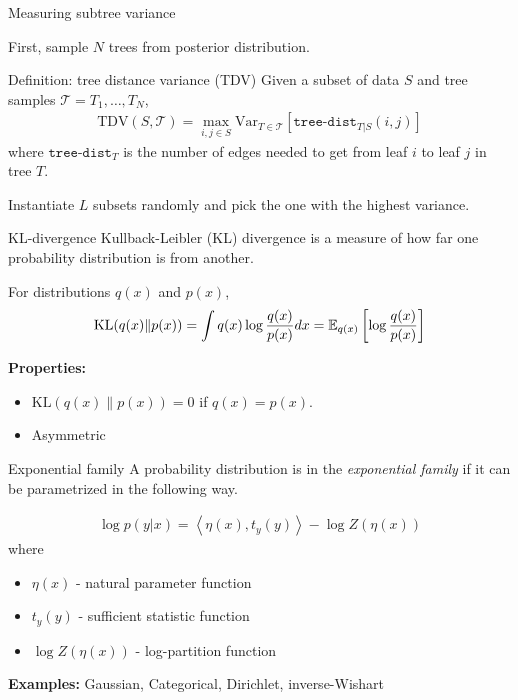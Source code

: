 \documentclass[10pt, compress]{beamer}
\begin{document}
\begin{frame}{Measuring subtree variance}

    First, sample $N$ trees from posterior distribution.

  \pause

  \begin{block}{Definition: tree distance variance (TDV)}
    Given a subset of data $S$ and tree samples $\mathcal{T} = T_1, \ldots, T_N$,
    \begin{align}
      \mathrm{TDV}(S, \mathcal{T}) = \max_{i, j \in S}  \mathrm{Var}_{T \in \mathcal{T}}\left[\texttt{tree-dist}_{T|S}(i, j)\right]
    \end{align}
  where $\texttt{tree-dist}_T$ is the number of edges needed to get from leaf $i$ to leaf $j$
  in tree $T$.
  \end{block}

  \pause

Instantiate $L$ subsets randomly and pick the one with the highest variance.

\end{frame}

\begin{frame}{KL-divergence}
  Kullback-Leibler (KL) divergence
  is a measure of how far one probability distribution
  is from another.

  \pause
  For distributions $q(x)$ and $p(x)$,
  \begin{align*}
    \textrm{KL}(q(x)\|p(x)) = \int q(x)\log \frac{q(x)}{p(x)}dx = \mathbb{E}_{q(x)}\left[\log\frac{q(x)}{p(x)}\right]
  \end{align*}

  \pause
  \textbf{Properties:}
  \begin{itemize}
    \item $\textrm{KL}(q(x)\|p(x)) = 0$ if $q(x) = p(x)$.
    \item Asymmetric
  \end{itemize}
\end{frame}

\begin{frame}{Exponential family}
  A probability distribution is in the \emph{exponential family}
  if it can be parametrized in the following way.

  \pause

  \begin{align*}
    \log p(y | x) = \left\langle\eta(x), t_y(y)\right\rangle - \log Z(\eta(x))
  \end{align*}
  where
  \begin{itemize}
      \pause
    \item $\eta(x)$ - natural parameter function
      \pause
    \item $t_y(y)$ - sufficient statistic function
      \pause
    \item $\log Z(\eta(x))$ - log-partition function
  \end{itemize}
  \pause
  \textbf{Examples:} Gaussian, Categorical, Dirichlet, inverse-Wishart
\end{frame}
\end{document}
